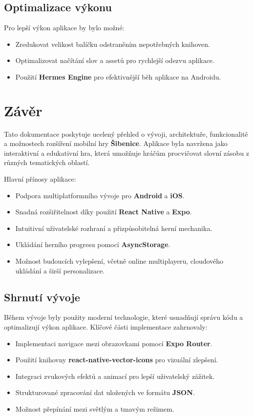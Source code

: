 \documentclass[a4paper,12pt]{article}
\begin{document}
\subsection{Optimalizace výkonu}

Pro lepší výkon aplikace by bylo možné:
\begin{itemize}
    \item Zredukovat velikost balíčku odstraněním nepotřebných knihoven.
    \item Optimalizovat načítání slov a assetů pro rychlejší odezvu aplikace.
    \item Použití \textbf{Hermes Engine} pro efektivnější běh aplikace na Androidu.
\end{itemize}

\section{Závěr}

Tato dokumentace poskytuje ucelený přehled o vývoji, architektuře, funkcionalitě a možnostech rozšíření mobilní hry \textbf{Šibenice}. Aplikace byla navržena jako interaktivní a edukativní hra, která umožňuje hráčům procvičovat slovní zásobu z různých tematických oblastí.

Hlavní přínosy aplikace:
\begin{itemize}
    \item Podpora multiplatformního vývoje pro \textbf{Android} a \textbf{iOS}.
    \item Snadná rozšiřitelnost díky použití \textbf{React Native} a \textbf{Expo}.
    \item Intuitivní uživatelské rozhraní a přizpůsobitelná herní mechanika.
    \item Ukládání herního progresu pomocí \textbf{AsyncStorage}.
    \item Možnost budoucích vylepšení, včetně online multiplayeru, cloudového ukládání a širší personalizace.
\end{itemize}

\subsection{Shrnutí vývoje}

Během vývoje byly použity moderní technologie, které usnadňují správu kódu a optimalizují výkon aplikace. Klíčové části implementace zahrnovaly:
\begin{itemize}
    \item Implementaci navigace mezi obrazovkami pomocí \textbf{Expo Router}.
    \item Použití knihovny \textbf{react-native-vector-icons} pro vizuální zlepšení.
    \item Integraci zvukových efektů a animací pro lepší uživatelský zážitek.
    \item Strukturované zpracování dat uložených ve formátu \textbf{JSON}.
    \item Možnost přepínání mezi světlým a tmavým režimem.
\end{itemize}
\end{document}
